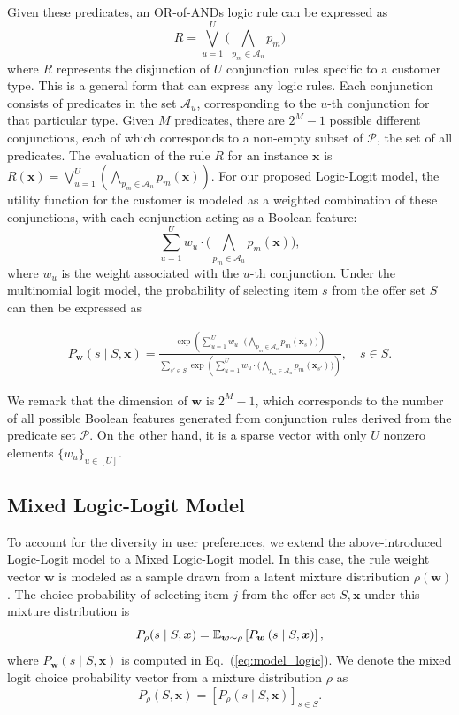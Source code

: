 \documentclass{article} %
\begin{document}
Given these predicates, an OR-of-ANDs logic rule can be expressed as
$$
R=\bigvee_{u=1}^{U}\Big(\bigwedge_{p_m \in \mathcal{A}_u} p_m\Big)
\label{eq:rule}
$$
where $R$ represents the disjunction of $U$ conjunction rules specific to a customer type. This is a general form that can express any logic rules.
Each conjunction consists of predicates in the set $\mathcal{A}_u$, corresponding to the $u$-th conjunction for that particular type. Given $M$ predicates, there are $2^{M}-1$ possible different conjunctions, each of which corresponds to a non-empty subset of $\mathcal{P}$, the set of all predicates. The evaluation of the rule $R$ for an instance $\boldsymbol{x}$ is 
$
R\left(\boldsymbol{x}\right)=\bigvee_{u=1}^{U}\left(\bigwedge_{p_m \in \mathcal{A}_u} p_m\left(\boldsymbol{x}\right)\right)
$.
For our proposed Logic-Logit model, the utility function for the customer is modeled as a weighted combination of these conjunctions, with each conjunction acting as a Boolean feature:
$$
\sum_{u=1}^{U} w_u \cdot\Big(\bigwedge_{p_m \in \mathcal{A}_u} p_m\left(\boldsymbol{x}\right)\Big),
$$
where $w_u$ is the weight associated with the $u$-th conjunction. Under the multinomial logit model, the probability of selecting item \(s\) from the offer set \(S\) can then be expressed as

\begin{align}\label{eq:model_logic}
P_{\boldsymbol{w}}\left(s \mid S, \boldsymbol{x}\right) = \frac{\exp\left(\sum_{u=1}^{U} w_u \cdot\big(\bigwedge_{p_m \in \mathcal{A}_u} p_m(\boldsymbol{x}_{s})\big)\right)}{\sum_{s' \in S} \exp\left(\sum_{u=1}^{U} w_u \cdot\big(\bigwedge_{p_m \in \mathcal{A}_u} p_m(\boldsymbol{x}_{s'})\big)\right)},\quad s \in S.
\end{align}

We remark that the dimension of $\boldsymbol{w}$ is $2^{M}-1$, which corresponds to the number of all possible Boolean features generated from conjunction rules derived from the predicate set $\mathcal{P}$. On the other hand, it is a sparse vector with only $U$ nonzero elements $\{w_u\}_{u\in[U]}$.

\subsection{Mixed Logic-Logit Model}\label{sec: mixed logic-logit}
To account for the diversity in user preferences, we extend the above-introduced Logic-Logit model to a Mixed Logic-Logit model. In this case, the rule weight vector \(\boldsymbol{w}\) is modeled as a sample drawn from a latent mixture distribution $\rho(\boldsymbol{w})$.  
%
The choice probability of selecting item \(j\) from the offer set \(S,\boldsymbol{x}\) under this mixture distribution is 
\begin{equation}
P_\rho(s\mid S,\boldsymbol{x}) = \mathbb{E}_{\boldsymbol{w}\sim\rho}\left[P_{\boldsymbol{w}}\left(s \mid S,\boldsymbol{x}\right) \right],
\end{equation}
where $P_{\boldsymbol{w}}\left(s\mid S,\boldsymbol{x}\right)$ is computed in Eq.~(\ref{eq:model_logic}). 
%
We denote the mixed logit choice probability vector from a mixture distribution $\rho$ as
$$
  P_\rho(S,\boldsymbol{x}) = [P_\rho\left(s \mid S, \boldsymbol{x}\right)]_{s\in S}.
$$
\end{document}
